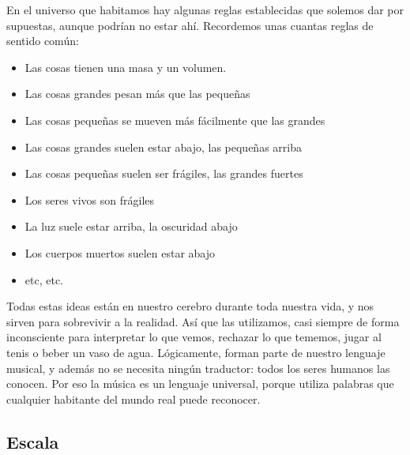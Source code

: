 \documentclass[]{article}
\providecommand{\tightlist}{%
  \setlength{
\itemsep}{0pt}\setlength{\parskip}{0pt}}
\begin{document}
En el universo que habitamos hay algunas reglas establecidas que solemos dar por supuestas, aunque podrían no estar ahí. Recordemos unas cuantas reglas de sentido común:

\begin{itemize}   \tightlist
  \item         Las cosas tienen una masa y un volumen.
  \item         Las cosas grandes pesan más que las pequeñas
  \item         Las cosas pequeñas se mueven más fácilmente que las grandes
  \item         Las cosas grandes suelen estar abajo, las pequeñas arriba
  \item         Las cosas pequeñas suelen ser frágiles, las grandes fuertes
  \item         Los seres vivos son frágiles
  \item         La luz suele estar arriba, la oscuridad abajo
  \item         Los cuerpos muertos suelen estar abajo
  \item         etc, etc.
\end{itemize}

Todas estas ideas están en nuestro cerebro durante toda nuestra vida, y nos sirven para sobrevivir a la realidad. Así que las         utilizamos, casi siempre de forma inconsciente para interpretar lo que         vemos, rechazar lo que tememos, jugar al tenis o beber un vaso de         agua. Lógicamente, forman parte de nuestro lenguaje musical, y además         no se necesita ningún traductor: todos los seres humanos las conocen.         Por eso la música es un lenguaje universal, porque utiliza palabras         que cualquier habitante del mundo real puede reconocer.

\subsection{Escala}
\end{document}
